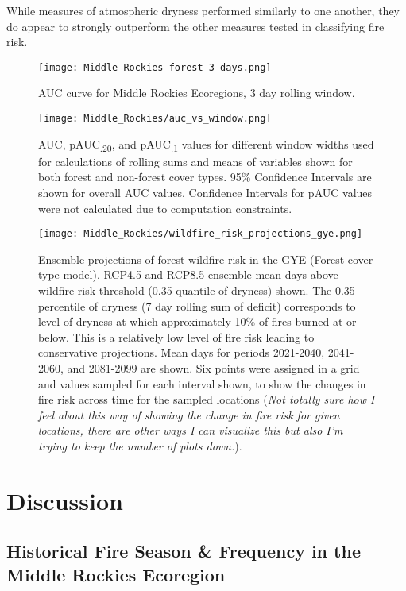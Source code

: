 \documentclass[11pt]{article}
\begin{document}
While measures of atmospheric dryness performed similarly to one another, they do appear to strongly outperform the other measures tested in classifying fire risk.   

\begin{figure}
  \centering
  \texttt{[image: Middle Rockies-forest-3-days.png]}
  \caption{AUC curve for Middle Rockies Ecoregions, 3 day rolling window.}
  \label{fig:auc}
\end{figure}

\begin{figure}[ht]
  \centering
  \texttt{[image: Middle\_Rockies/auc\_vs\_window.png]}
  \caption{AUC, pAUC\textsubscript{.20}, and pAUC\textsubscript{.1} values for different window widths used for calculations of rolling sums and means of variables shown for both forest and non-forest cover types. 95\% Confidence Intervals are shown for overall AUC values.  Confidence Intervals for pAUC values were not calculated due to computation constraints.}
  \label{fig:auc_window}
\end{figure}

\begin{figure}
  \centering
  \texttt{[image: Middle\_Rockies/wildfire\_risk\_projections\_gye.png]}
  \caption{Ensemble projections of forest wildfire risk in the GYE (Forest cover type model).  RCP4.5 and RCP8.5 ensemble mean days above wildfire risk threshold (0.35 quantile of dryness) shown.  The 0.35 percentile of dryness (7 day rolling sum of deficit) corresponds to level of dryness at which approximately 10\% of fires burned at or below.  This is a relatively low level of fire risk leading to conservative projections.  Mean days for periods 2021-2040, 2041-2060, and 2081-2099 are shown.  Six points were assigned in a grid and values sampled for each interval shown, to show the changes in fire risk across time for the sampled locations (\textit{Not totally sure how I feel about this way of showing the change in fire risk for given locations, there are other ways I can visualize this but also I'm trying to keep the number of plots down.}).}
  \label{fig:projected-risk}
\end{figure}

\section{Discussion}
\subsection{Historical Fire Season \& Frequency in the Middle Rockies Ecoregion}
\end{document}
